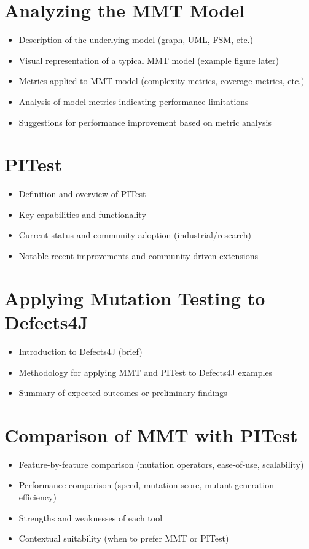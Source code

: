 \documentclass[sigplan, nonacm]{acmart}
\begin{document}
\section{Analyzing the MMT Model}
\begin{itemize}
	\item Description of the underlying model (graph, UML, FSM, etc.)
	\item Visual representation of a typical MMT model (example figure later)
	\item Metrics applied to MMT model (complexity metrics, coverage metrics, etc.)
	\item Analysis of model metrics indicating performance limitations
	\item Suggestions for performance improvement based on metric analysis
\end{itemize}

\section{PITest}
\begin{itemize}
	\item Definition and overview of PITest
	\item Key capabilities and functionality
	\item Current status and community adoption (industrial/research)
	\item Notable recent improvements and community-driven extensions
\end{itemize}

\section{Applying Mutation Testing to Defects4J}
\begin{itemize}
	\item Introduction to Defects4J (brief)
	\item Methodology for applying MMT and PITest to Defects4J examples
	\item Summary of expected outcomes or preliminary findings
\end{itemize}

\section{Comparison of MMT with PITest}
\begin{itemize}
	\item Feature-by-feature comparison (mutation operators, ease-of-use, scalability)
	\item Performance comparison (speed, mutation score, mutant generation efficiency)
	\item Strengths and weaknesses of each tool
	\item Contextual suitability (when to prefer MMT or PITest)
\end{itemize}
\end{document}
